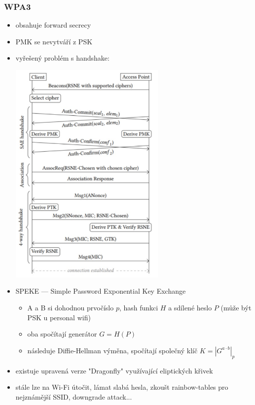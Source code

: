 \subsubsection*{WPA3}
\begin{itemize}
	\item obsahuje forward secrecy
	\item PMK se nevytváří z PSK
	\item vyřešený problém s handshake:
	
	\includegraphics[width=0.6\textwidth]{img/OB-13_4.jpg}
	
	\item SPEKE --- Simple Password Exponential Key Exchange
	\begin{itemize}
		\item A a B si dohodnou prvočíslo $p$, hash funkci $H$ a sdílené heslo $P$ (může být PSK u personal wifi)
		\item oba spočítají generátor $G = H(P)$
		\item následuje Diffie-Hellman výměna, spočítají společný klíč $K = |G^{a \cdot b}|_p$
	\end{itemize}
	\item existuje upravená verze "Dragonfly" využívající eliptických křivek
	\item stále lze na Wi-Fi útočit, lámat slabá hesla, zkoušt rainbow-tables pro nejznámější SSID, downgrade attack...
\end{itemize}